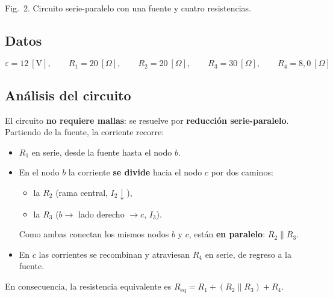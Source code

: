 \documentclass[12pt,letterpaper]{article}
\begin{document}
\begin{center}
\\[2pt]
{\footnotesize Fig.\ 2. Circuito serie-paralelo con una fuente y cuatro resistencias.}
\end{center}

\subsection*{Datos}

\[
    \varepsilon = 12\ [\text{V}],\qquad
    R_1 = 20\ [\Omega],\qquad
    R_2 = 20\ [\Omega],\qquad
    R_3 = 30\ [\Omega],\qquad
    R_4 = 8{,}0\ [\Omega]
\]

\subsection*{An\'alisis del circuito}

El circuito \textbf{no requiere mallas}: se resuelve por \textbf{reducci\'on serie-paralelo}.
Partiendo de la fuente, la corriente recorre:

\begin{itemize}
    \item \textbf{\textcolor{colR1}{$R_1$}} en serie, desde la fuente hasta el nodo $b$.
    \item En el nodo $b$ la corriente \textbf{se divide} hacia el nodo $c$ por dos caminos:
          \begin{itemize}
              \item la \textbf{\textcolor{colR2}{$R_2$}} (rama central, $I_2 \downarrow$),
              \item la \textbf{\textcolor{colR3}{$R_3$}} ($b \to$ lado derecho $\to c$, $I_3$).
          \end{itemize}
          Como ambas conectan los mismos nodos $b$ y $c$, est\'an \textbf{en paralelo}:
          $R_2 \parallel R_3$.
    \item En $c$ las corrientes se recombinan y atraviesan \textbf{\textcolor{colR4}{$R_4$}}
          en serie, de regreso a la fuente.
\end{itemize}

\noindent En consecuencia, la resistencia equivalente es
$R_{\text{eq}} = R_1 + (R_2 \parallel R_3) + R_4$.
\end{document}
